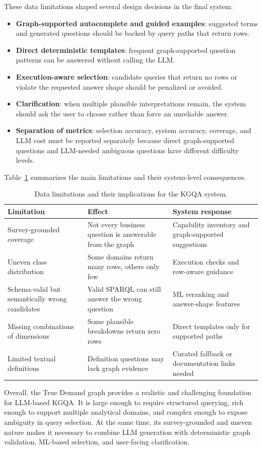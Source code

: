 These data limitations shaped several design decisions in the final system:

\begin{itemize}
    \item \textbf{Graph-supported autocomplete and guided examples}: suggested terms and generated questions should be backed by query paths that return rows.
    \item \textbf{Direct deterministic templates}: frequent graph-supported question patterns can be answered without calling the LLM.
    \item \textbf{Execution-aware selection}: candidate queries that return no rows or violate the requested answer shape should be penalized or avoided.
    \item \textbf{Clarification}: when multiple plausible interpretations remain, the system should ask the user to choose rather than force an unreliable answer.
    \item \textbf{Separation of metrics}: selection accuracy, system accuracy, coverage, and LLM cost must be reported separately because direct graph-supported questions and LLM-needed ambiguous questions have different difficulty levels.
\end{itemize}

Table~\ref{tab:data-limitations} summarizes the main limitations and their system-level consequences.

\begin{table}[ht]
\centering
\caption{Data limitations and their implications for the KGQA system.}
\label{tab:data-limitations}
\begin{tabular}{p{4.2cm}p{5.2cm}p{4.2cm}}
\hline
\textbf{Limitation} & \textbf{Effect} & \textbf{System response} \\
\hline
Survey-grounded coverage & Not every business question is answerable from the graph & Capability inventory and graph-supported suggestions \\
Uneven class distribution & Some domains return many rows, others only few & Execution checks and row-aware guidance \\
Schema-valid but semantically wrong candidates & Valid SPARQL can still answer the wrong question & ML reranking and answer-shape features \\
Missing combinations of dimensions & Some plausible breakdowns return zero rows & Direct templates only for supported paths \\
Limited textual definitions & Definition questions may lack graph evidence & Curated fallback or documentation links needed \\
\hline
\end{tabular}
\end{table}

Overall, the True Demand graph provides a realistic and challenging foundation for LLM-based KGQA. It is large enough to require structured querying, rich enough to support multiple analytical domains, and complex enough to expose ambiguity in query selection. At the same time, its survey-grounded and uneven nature makes it necessary to combine LLM generation with deterministic graph validation, ML-based selection, and user-facing clarification.
